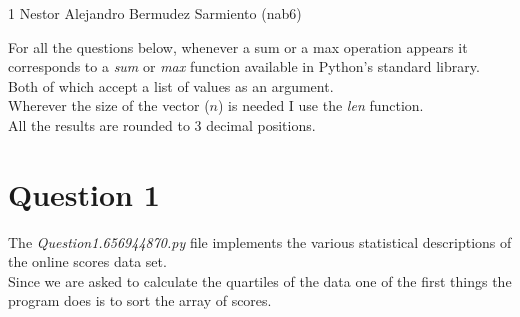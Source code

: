 \documentclass[11pt]{article}
\begin{document}
\homework
    {1}
    {Nestor Alejandro Bermudez Sarmiento (nab6)}
    {}

For all the questions below, whenever a sum or a max operation appears it corresponds to a \textit{sum} or \textit{max} function available in Python's standard library. Both of which accept a list of values as an argument.\\
Wherever the size of the vector ($n$) is needed I use the \textit{len} function.\\
All the results are rounded to 3 decimal positions.

\section*{Question 1}
The \textit{Question1.656944870.py} file implements the various statistical descriptions of the online scores data set.\\
Since we are asked to calculate the quartiles of the data one of the first things the program does is to sort the array of scores.\\
\end{document}
